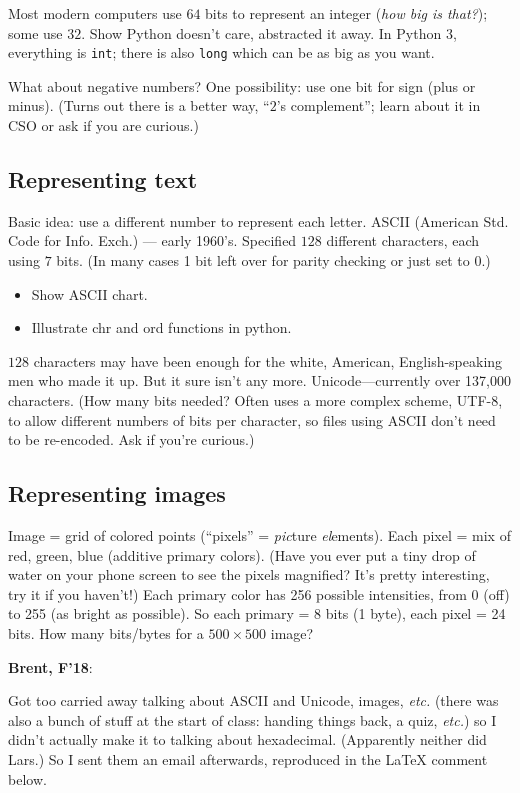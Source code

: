 \documentclass{article}
\newenvironment{reflect}[1]
{
  \noindent
  \begin{lrbox}{\reflectbox}
    \begin{minipage}[t]{\textwidth}
      \textbf{#1}:
}{
    \end{minipage}
  \end{lrbox}
  \fbox{\usebox{\reflectbox}}
}
\begin{document}
Most modern computers use $64$ bits to represent an integer (\emph{how
  big is that?}); some use $32$. Show Python doesn't care, abstracted
it away.  In Python 3, everything is \texttt{int}; there is also
\texttt{long} which can be as big as you want.

What about negative numbers?  One possibility: use one bit for sign
(plus or minus).  (Turns out there is a better way, ``$2$'s
complement''; learn about it in CSO or ask if you are curious.)

\subsection*{Representing text}

Basic idea: use a different number to represent each letter.  ASCII
(American Std. Code for Info. Exch.) --- early 1960's.  Specified
$128$ different characters, each using $7$ bits.  (In many cases 1 bit
left over for parity checking or just set to $0$.)
\begin{itemize}
\item Show ASCII chart.
\item Illustrate chr and ord functions in python.
\end{itemize}
$128$ characters may have been enough for the white, American,
English-speaking men who made it up.  But it sure isn't any more.
Unicode---currently over 137,000 characters. (How many bits needed?
Often uses a more complex scheme, UTF-8, to allow different numbers of
bits per character, so files using ASCII don't need to be re-encoded.
Ask if you're curious.)

\subsection*{Representing images}

Image = grid of colored points (``pixels'' = \emph{pic}ture
\emph{el}ements).  Each pixel = mix of red, green, blue (additive
primary colors). (Have you ever put a tiny drop of water on your phone
screen to see the pixels magnified?  It's pretty interesting, try it
if you haven't!) Each primary color has 256 possible intensities, from
0 (off) to 255 (as bright as possible).  So each primary = 8 bits (1
byte), each pixel = 24 bits.  How many bits/bytes for a
$500 \times 500$ image?

\begin{reflect}{Brent, F'18}
  Got too carried away talking about ASCII and Unicode, images,
  \emph{etc.} (there was also a bunch of stuff at the start of class:
  handing things back, a quiz, \emph{etc.}) so I didn't actually make
  it to talking about hexadecimal.  (Apparently neither did Lars.)  So
  I sent them an email afterwards, reproduced in the LaTeX comment below.
\end{reflect}
\end{document}
